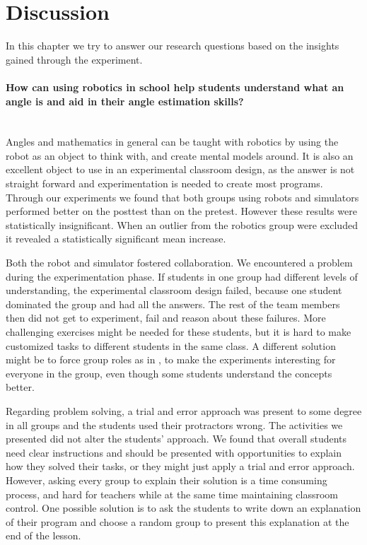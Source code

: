 \section{Discussion}
In this chapter we try to answer our research questions based on the insights gained through the experiment. 

\paragraph{How can using robotics in school help students understand what an angle is and aid in their angle estimation skills?}~\\
Angles and mathematics in general can be taught with robotics by using the robot as an object to think with, and create mental models around. It is also an excellent object to use in an experimental classroom design, as the answer is not straight forward and experimentation is needed to create most programs. Through our experiments we found that both groups using robots and simulators performed better on the posttest than on the pretest. However these results were statistically insignificant. When an outlier from the robotics group were excluded it revealed a statistically significant mean increase. 

\bigskip\noindent
Both the robot and simulator fostered collaboration. We encountered a problem during the experimentation phase. If students in one group had different levels of understanding, the experimental classroom design failed, because one student dominated the group and had all the answers. The rest of the team members then did not get to experiment, fail and reason about these failures. More challenging exercises might be needed for these students, but it is hard to make customized tasks to different students in the same class. A different solution might be to force group roles as in \cite{mitnik2009collaborative}, to make the experiments interesting for everyone in the group, even though some students understand the concepts better.

\bigskip\noindent
Regarding problem solving, a trial and error approach was present to some degree in all groups and the students used their protractors wrong. The activities we presented did not alter the students' approach. We found that overall students need clear instructions and should be presented with opportunities to explain how they solved their tasks, or they might just apply a trial and error approach. However, asking every group to explain their solution is a time consuming process, and hard for teachers while at the same time maintaining classroom control. One possible solution is to ask the students to write down an explanation of their program and choose a random group to present this explanation at the end of the lesson.

